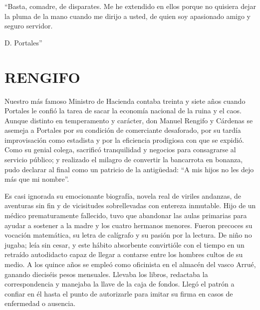 \documentclass[10pt,twoside,openright]{memoir}
\begin{document}
``Basta, comadre, de disparates. Me he extendido en ellos porque no
quisiera dejar la pluma de la mano cuando me dirijo a usted, de quien
soy apasionado amigo y seguro servidor.

D. Portales''

\chapter{RENGIFO}

Nuestro más famoso Ministro de Hacienda contaba treinta y siete años
cuando Portales le confió la tarea de sacar la economía nacional de la
ruina y el caos. Aunque distinto en temperamento y carácter, don Manuel
Rengifo y Cárdenas se asemeja a Portales por su condición de comerciante
desaforado, por su tardía improvisación como estadista y por la
eficiencia prodigiosa con que se expidió. Como su genial colega,
sacrificó tranquilidad y negocios para consagrarse al servicio público;
y realizado el milagro de convertir la bancarrota en bonanza, pudo
declarar al final como un patricio de la antigüedad: ``A mis hijos no les
dejo más que mi nombre''.

Es casi ignorada su emocionante biografía, novela real de viriles
andanzas, de aventuras sin fin y de vicisitudes sobrellevadas con
entereza inmutable. Hijo de un médico prematuramente fallecido, tuvo que
abandonar las aulas primarias para ayudar a sostener a la madre y los
cuatro hermanos menores. Fueron precoces su vocación matemática, su
letra de calígrafo y su pasión por la lectura. De niño no jugaba; leía
sin cesar, y este hábito absorbente convirtióle con el tiempo en un
retraído autodidacto capaz de llegar a contarse entre los hombres cultos
de su medio. A los quince años se empleó como oficinista en el almacén
del vasco Arrué, ganando dieciséis pesos mensuales. Llevaba los libros,
redactaba la correspondencia y manejaba la llave de la caja de fondos.
Llegó el patrón a confiar en él hasta el punto de autorizarle para
imitar su firma en casos de enfermedad o ausencia.
\end{document}
